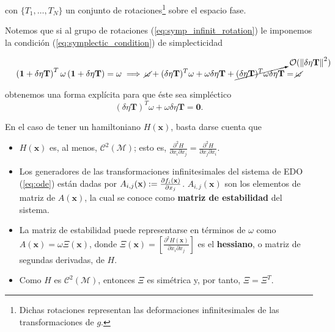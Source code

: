 con $\lbrace T_1, \ldots, T_N \rbrace$ un conjunto de rotaciones\footnote{Dichas rotaciones representan las deformaciones infinitesimales de las transformaciones de $g$.} sobre el espacio fase.

Notemos que si al grupo de rotaciones (\ref{eq:symp_infinit_rotation}) le imponemos la condición (\ref{eq:symplectic_condition}) de simplecticidad

\begin{align*}
  \left( \mathbf{1} + \delta \eta \mathbf{T} \right)^T \omega \left( \mathbf{1} + \delta \eta \mathbf{T} \right) = \omega \implies 
  \cancel{\omega} + (\delta \eta \mathbf{T})^T \omega + \omega \delta \eta \mathbf{T} + \cancelto{\mathcal{O}(\left\lVert\delta \eta \mathbf{T}\right\rVert^2)} {(\delta \eta \mathbf{T})^T \omega \delta \eta \mathbf{T}} = \cancel{\omega}  
\end{align*}

obtenemos una forma explícita para que éste sea simpléctico
\begin{equation}
  (\delta \eta \mathbf{T})^T \omega + \omega \delta \eta \mathbf{T} = \mathbf{0}.
  \label{eq:eq:symplectic_condition2}
\end{equation}

En el caso de tener un hamiltoniano $H(\mathbf{x})$, basta darse cuenta que
\begin{itemize}
\item $H(\mathbf{x})$ es, al menos, $\mathcal{C}^2(\mathcal{M})$; esto es, $\frac{\partial^2 H}{\partial x_i \partial x_j} = \frac{\partial^2 H}{\partial x_j \partial x_i}$.

\item Los generadores de las transformaciones infinitesimales del sistema de EDO (\ref{eq:ode}) están dadas por $A_{i,j}(\mathbf{x}) := \frac{\partial f_i(\mathbf{x})}{\partial x_j}$. $A_{i,j}(\mathbf{x})$ son los elementos de matriz de $A(\mathbf{x})$, la cual se conoce como \textbf{matriz de estabilidad} del sistema.

\item La matriz de estabilidad puede representarse en términos de $\omega$ como $A(\mathbf{x}) = \omega \Xi(\mathbf{x})$, donde $\Xi(\mathbf{x}) = \left[ \frac{\partial^2 H(\mathbf{x})}{\partial x_i \partial x_j} \right]$ es el \textbf{hessiano}, o matriz de segundas derivadas, de $H$.

\item Como $H$ es $\mathcal{C}^2(\mathcal{M})$, entonces $\Xi$ es simétrica y, por tanto, $\Xi = \Xi^T$.
\end{itemize}

